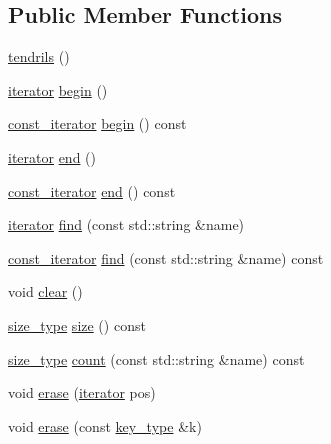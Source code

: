 \subsection*{Public Member Functions}
\begin{DoxyCompactItemize}
\item 
\hyperlink{classecto_1_1tendrils_a4e76bfe7ed91c88fa8bd3249c275c0ef}{tendrils} ()
\item 
\hyperlink{classecto_1_1tendrils_a6f0b7bd6e3a03f047351303630b889e0}{iterator} \hyperlink{classecto_1_1tendrils_a1191620f21a9dc618eb4380e2cf48b63}{begin} ()
\item 
\hyperlink{classecto_1_1tendrils_a86df9983555ca4ebdae8b1d36aa4bbd8}{const\+\_\+iterator} \hyperlink{classecto_1_1tendrils_a10d0c932826165f25406b849b958ad27}{begin} () const 
\item 
\hyperlink{classecto_1_1tendrils_a6f0b7bd6e3a03f047351303630b889e0}{iterator} \hyperlink{classecto_1_1tendrils_ae77c08ecbfff9aa13b442e4e9eb11441}{end} ()
\item 
\hyperlink{classecto_1_1tendrils_a86df9983555ca4ebdae8b1d36aa4bbd8}{const\+\_\+iterator} \hyperlink{classecto_1_1tendrils_aec3278598a3d3bc3c3810ec3cecf72cb}{end} () const 
\item 
\hyperlink{classecto_1_1tendrils_a6f0b7bd6e3a03f047351303630b889e0}{iterator} \hyperlink{classecto_1_1tendrils_a4af12838006b6cfda8157dc3957c166e}{find} (const std\+::string \&name)
\item 
\hyperlink{classecto_1_1tendrils_a86df9983555ca4ebdae8b1d36aa4bbd8}{const\+\_\+iterator} \hyperlink{classecto_1_1tendrils_af0ef7fa5535b477b83620a66331a475b}{find} (const std\+::string \&name) const 
\item 
void \hyperlink{classecto_1_1tendrils_ac7bfc201ab8170684307cb7095323c2d}{clear} ()
\item 
\hyperlink{classecto_1_1tendrils_af3726f822a4fd60a1095bba31f1926ef}{size\+\_\+type} \hyperlink{classecto_1_1tendrils_a3f86ef76f17dbde432321239fcbfd639}{size} () const 
\item 
\hyperlink{classecto_1_1tendrils_af3726f822a4fd60a1095bba31f1926ef}{size\+\_\+type} \hyperlink{classecto_1_1tendrils_aa6bc2c6a64d087c1b516119d0550f83c}{count} (const std\+::string \&name) const 
\item 
void \hyperlink{classecto_1_1tendrils_a700cd209735e5b6254669a6f9c16b74f}{erase} (\hyperlink{classecto_1_1tendrils_a6f0b7bd6e3a03f047351303630b889e0}{iterator} pos)
\item 
void \hyperlink{classecto_1_1tendrils_a58aa945fa23bdeef212ea4a69d077e52}{erase} (const \hyperlink{classecto_1_1tendrils_aa6165c6ab72d93cd56796ea81e450245}{key\+\_\+type} \&k)

\end{DoxyCompactItemize}
